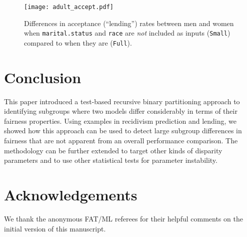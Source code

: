 \documentclass[11pt, sigconf, svgnames]{acmart}
\begin{document}




{
\begin{figure}[t]
\texttt{[image: adult\_accept.pdf]}
\caption{Differences in acceptance (``lending'') rates between men and women when \texttt{marital.status} and \texttt{race} are \emph{not} included as inputs (\texttt{Small}) compared to when they are (\texttt{Full}).}
\label{fig:adult_accept}
\end{figure}
}

\section{Conclusion}

This paper introduced a test-based recursive binary partitioning approach to identifying subgroups where two models differ considerably in terms of their fairness properties.  Using examples in recidivism prediction and lending, we showed how this approach can be used to detect large subgroup differences in fairness that are not apparent from an overall performance comparison.  The methodology can be further extended to target other kinds of disparity parameters and to use other statistical tests for parameter instability.  

\section{Acknowledgements}  
We thank the anonymous FAT/ML referees for their helpful comments on the initial version of this manuscript.  
\end{document}
